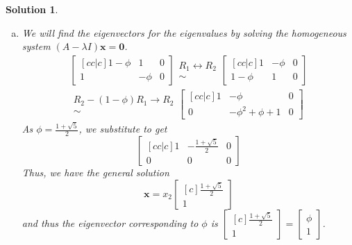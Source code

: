 \documentclass[11pt]{scrartcl}
\theoremstyle{dotlessP}
\newtheorem{sol}{Solution}[section]
\theoremstyle{dotlessN}
\newcommand{\lra}{\leftrightarrow}
\begin{document}
\begin{sol}
\begin{enumerate}[(a)]
\begin{align*}
				\frac{1 \pm \sqrt{5}}{2}
			\end{align*}
			Thus, the positive eigenvalue is $\phi = \frac{1+\sqrt{5}}{2}$. We will verify that the negative eigenvalue is equal to $-1/\phi$ by setting the two equal and seeing if we reach a contradiction.
			\begin{align*}
				-\frac{2}{1 + \sqrt{5}} &= \frac{1-\sqrt{5}}{2} \\
				-4 &= (1+\sqrt{5})(1-\sqrt{5}) \\
				-4 &= -4
			\end{align*}
			Thus, we have shown that the negative eigenvalue is equal to $-1/\phi$.
		\item 
We will find the eigenvectors for the eigenvalues by solving the homogeneous system $(A-\lambda I)\bm{x} = \bm{0}$.
			\begin{align*}
				\begin{bmatrix}[cc|c]
				1 - \phi & 1 & 0 \\
				1 & -\phi & 0
				\end{bmatrix}
				\begin{array}{c}
					R_1 \lra R_2 \\
					\sim
				\end{array}
				\begin{bmatrix}[cc|c]
				1 & -\phi & 0\\
				1 - \phi & 1 & 0 
				\end{bmatrix} \\
								\begin{array}{c}
					R_2 - (1-\phi)R_1 \to R_2 \\
					\sim
				\end{array}
				\begin{bmatrix}[cc|c]
				1 & -\phi & 0\\
				0 & -\phi^2 + \phi + 1 & 0
			\end{bmatrix}
			\end{align*}
			As $\phi = \frac{1 + \sqrt{5}}{2}$, we substitute to get
			\[
				\begin{bmatrix}[cc|c]
					1 & -\frac{1 + \sqrt{5}}{2} &0 \\
					0 & 0 & 0
			\end{bmatrix}
			\] 
			Thus, we have the general solution
			\[
				\bm{x} = x_2 
				\begin{bmatrix}[c]
				\frac{1 + \sqrt{5}}{2} \\
				1
			\end{bmatrix}		
			\] 
			and thus the eigenvector corresponding to $\phi$ is $
			\begin{bmatrix}[c]
	\frac{1 + \sqrt{5}}{2} \\
	1
\end{bmatrix} =
\begin{bmatrix}
	\phi \\
	1
\end{bmatrix}
			$.


\end{enumerate}
\end{sol}
\end{document}
